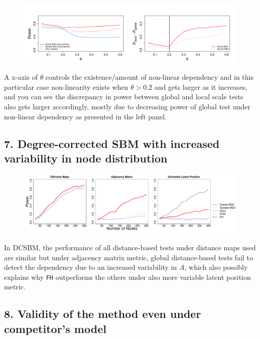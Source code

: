 \documentclass[12pt]{article}
\begin{document}
\begin{figure}[H]
	\centering
	\includegraphics[width=5in]{../Figure/powerplot.pdf}
	\label{fig:powerplot}
\end{figure}

A x-axis of $\theta$ controls the existence/amount of non-linear dependency and in this particular case non-linearity exists when $\theta > 0.2$ and gets larger as it increases, and you can see the discrepancy in power between global and local scale tests also gets larger accordingly, mostly due to decreasing power of global test under non-linear dependency as presented in the left panel.

\subsection*{7. Degree-corrected SBM with increased variability in node distribution}	

\begin{figure}[H]
	\centering
	\includegraphics[width=6in]{../Figure/dcSBM.pdf}
	\label{fig:dcSBM}
\end{figure}	

In DCSBM, the performance of all distance-based tests under distance maps used are similar but under adjacency matrix metric, global distance-based tests fail to detect the dependency due to an increased variability in $A$, which also possibly explains why \texttt{FH} outperforms the others under also more variable latent position metric.


\subsection*{8. Validity of the method even under competitor's model}
\end{document}
